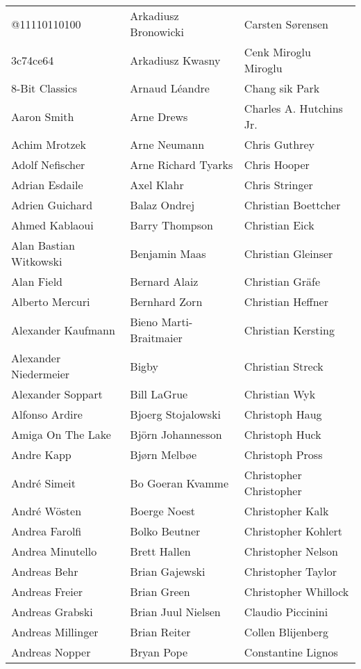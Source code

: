\newpage
\setlength{\tabcolsep}{1mm}
\begin{tabular}{p{4.5cm}p{4.5cm}p{4.5cm}}
@11110110100 & Arkadiusz Bronowicki & Carsten Sørensen \\
3c74ce64 & Arkadiusz Kwasny & Cenk Miroglu Miroglu \\
8-Bit Classics & Arnaud Léandre & Chang sik Park \\
Aaron Smith & Arne Drews & Charles A. Hutchins Jr. \\
Achim Mrotzek & Arne Neumann & Chris Guthrey \\
Adolf Nefischer & Arne Richard Tyarks & Chris Hooper \\
Adrian Esdaile & Axel Klahr & Chris Stringer \\
Adrien Guichard & Balaz Ondrej & Christian Boettcher \\
Ahmed Kablaoui & Barry Thompson & Christian Eick \\
Alan Bastian Witkowski & Benjamin Maas & Christian Gleinser \\
Alan Field & Bernard Alaiz & Christian Gräfe \\
Alberto Mercuri & Bernhard Zorn & Christian Heffner \\
Alexander Kaufmann & Bieno Marti-Braitmaier & Christian Kersting \\
Alexander Niedermeier & Bigby & Christian Streck \\
Alexander Soppart & Bill LaGrue & Christian Wyk \\
Alfonso Ardire & Bjoerg Stojalowski & Christoph Haug \\
Amiga On The Lake & Björn Johannesson & Christoph Huck \\
Andre Kapp & Bjørn Melbøe & Christoph Pross \\
André Simeit & Bo Goeran Kvamme & Christopher Christopher \\
André Wösten & Boerge Noest & Christopher Kalk \\
Andrea Farolfi & Bolko Beutner & Christopher Kohlert \\
Andrea Minutello & Brett Hallen & Christopher Nelson \\
Andreas Behr & Brian Gajewski & Christopher Taylor \\
Andreas Freier & Brian Green & Christopher Whillock \\
Andreas Grabski & Brian Juul Nielsen & Claudio Piccinini \\
Andreas Millinger & Brian Reiter & Collen Blijenberg \\
Andreas Nopper & Bryan Pope & Constantine Lignos \\

\end{tabular}
